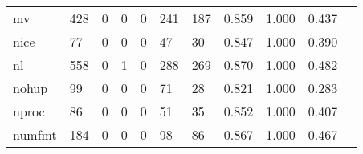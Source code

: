 \begin{longtable}{lp{1.2cm}p{1.2cm}p{1.2cm}p{1.2cm}p{1.2cm}p{1.2cm}p{1.2cm}p{1.2cm}p{1.2cm}p{1.2cm}}
mv        &                                   428 &                                                  0 &                                                  0 &                                                  0 &                                                241 &                                                187 &                                              0.859 &                                              1.000 &                                              0.437 \\
nice      &                                    77 &                                                  0 &                                                  0 &                                                  0 &                                                 47 &                                                 30 &                                              0.847 &                                              1.000 &                                              0.390 \\
nl        &                                   558 &                                                  0 &                                                  1 &                                                  0 &                                                288 &                                                269 &                                              0.870 &                                              1.000 &                                              0.482 \\
nohup     &                                    99 &                                                  0 &                                                  0 &                                                  0 &                                                 71 &                                                 28 &                                              0.821 &                                              1.000 &                                              0.283 \\
nproc     &                                    86 &                                                  0 &                                                  0 &                                                  0 &                                                 51 &                                                 35 &                                              0.852 &                                              1.000 &                                              0.407 \\
numfmt    &                                   184 &                                                  0 &                                                  0 &                                                  0 &                                                 98 &                                                 86 &                                              0.867 &                                              1.000 &                                              0.467 \\

\end{longtable}
